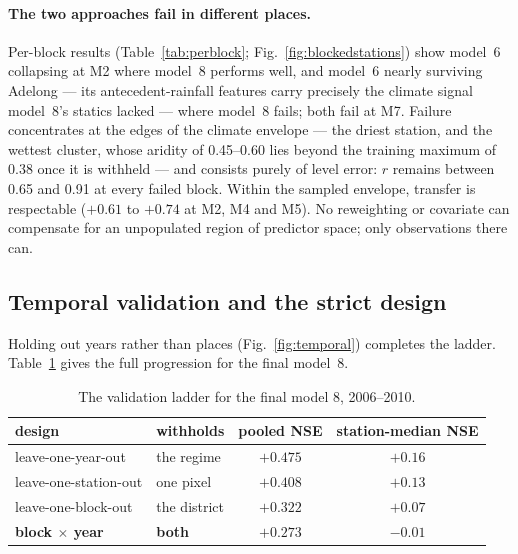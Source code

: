 \documentclass[11pt,a4paper]{article}
\begin{document}
\paragraph{The two approaches fail in different places.} Per-block results
(Table~\ref{tab:perblock}; Fig.~\ref{fig:blockedstations}) show model~6
collapsing at M2 where model~8 performs well, and model~6 nearly surviving
Adelong --- its antecedent-rainfall features carry precisely the climate
signal model~8's statics lacked --- where model~8 fails; both fail at M7.
Failure concentrates at the edges of the climate envelope --- the driest
station, and the wettest cluster, whose aridity of 0.45--0.60 lies beyond the
training maximum of 0.38 once it is withheld --- and consists purely of level
error: $r$ remains between 0.65 and 0.91 at every failed block. Within the
sampled envelope, transfer is respectable ($+0.61$ to $+0.74$ at M2, M4 and
M5). No reweighting or covariate can compensate for an unpopulated region of
predictor space; only observations there can.

\subsection{Temporal validation and the strict design}\label{sec:temporal}

Holding out years rather than places (Fig.~\ref{fig:temporal}) completes the
ladder. Table~\ref{tab:ladder} gives the full progression for the final
model~8.

\begin{table}[htbp]
\centering
\caption{The validation ladder for the final model 8, 2006--2010.}
\label{tab:ladder}
\small
\begin{tabular}{llcc}
\toprule
design & withholds & pooled NSE & station-median NSE \\
\midrule
leave-one-year-out      & the regime          & $+0.475$          & $+0.16$ \\
leave-one-station-out   & one pixel           & $+0.408$          & $+0.13$ \\
leave-one-block-out     & the district        & $+0.322$          & $+0.07$ \\
\textbf{block $\times$ year} & \textbf{both}  & $\mathbf{+0.273}$ & $\mathbf{-0.01}$ \\
\bottomrule
\end{tabular}
\end{table}
\end{document}
